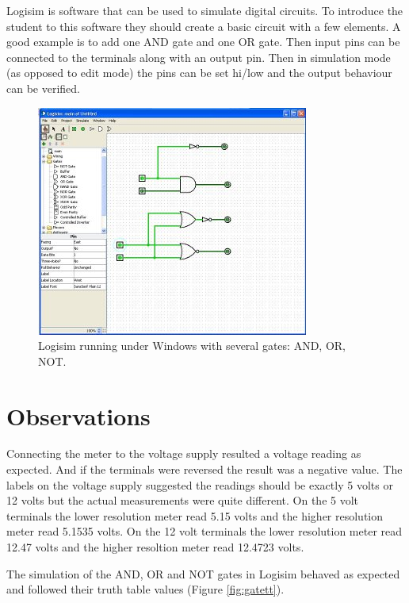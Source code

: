 \documentclass{article}
\begin{document}
Logisim \cite{LOGISIM} is software that can be used to simulate digital
circuits.
To introduce the student to this software they should create a basic circuit
with a few elements.
A good example is to add one AND gate and one OR gate.
Then input pins can be connected to the terminals along with an output pin.
Then in simulation mode (as opposed to edit mode) the pins can be set hi/low
and the output behaviour can be verified.

\begin{figure}[!hbtp]
\center
\includegraphics[scale=1.0]{logisim-02}
\caption{Logisim running under Windows with several gates: AND, OR, NOT.}
\label{fig:logisim}
\end{figure}

\clearpage %

\section{Observations}

Connecting the meter to the voltage supply resulted a voltage reading
as expected.
And if the terminals were reversed the result was a negative value.
The labels on the voltage supply suggested the readings should be
exactly 5 volts or 12 volts but the actual measurements were quite different.
On the 5 volt terminals the lower resolution meter read 5.15 volts and
the higher resolution meter read 5.1535 volts.
On the 12 volt terminals the lower resolution meter read 12.47 volts and
the higher resoltion meter read 12.4723 volts.

The simulation of the AND, OR and NOT gates in Logisim behaved as expected
and followed their truth table values (Figure \ref{fig:gatett}).
\end{document}
